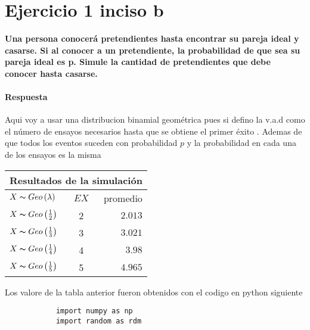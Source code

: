 \documentclass{article}
\begin{document}
    \section*{Ejercicio 1 inciso b }  
    \begin{flushleft}
        
        
        {\bf Una persona conocer\'a pretendientes hasta encontrar su pareja ideal y
        casarse. Si al conocer a un pretendiente, la probabilidad de que sea su pareja ideal
        es p. Simule la cantidad de pretendientes que debe conocer hasta casarse.}
        
        \paragraph{Respuesta}
        Aqui voy a usar una distribucion binamial geom\'etrica  pues si defino la v.a.d como 
        el n\'umero de ensayos necesarios hasta que se obtiene el primer \'exito . Ademas de 
        que todos los eventos suceden con probabilidad $p$ y la probabilidad en cada una de 
        los ensayos es la misma 


        \begin{center}
            \begin{tabular}{|l|c|r|}
                \hline
                \multicolumn{3}{|c|}{Resultados de la simulaci\'on}\\
                \hline
                \hline
                $X  \thicksim  Geo \left(\lambda\right) $ & $EX$ & promedio \\
                \hline
                $X  \thicksim  Geo \left(\frac{1}{2}\right) $ & 2& $2.013$  \\
                \hline 
                $X  \thicksim  Geo \left(\frac{1}{3}\right) $ & 3 & $3.021$  \\
                \hline
                $X  \thicksim  Geo \left(\frac{1}{4}\right) $ & 4 & $3.98$ \\
                \hline
                $X  \thicksim  Geo \left(\frac{1}{5}\right) $ & 5 & $4.965$  \\
                \hline
            \end{tabular}
        \end{center}

        Los valore de la tabla anterior fueron obtenidos con el codigo en python siguiente 

        \begin{verbatim} 
            import numpy as np 
            import random as rdm 
            

\end{verbatim}
\end{flushleft}
\end{document}
